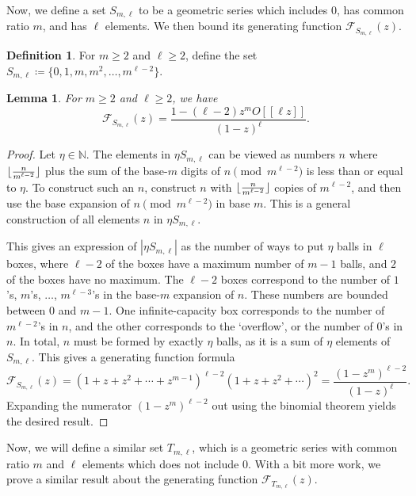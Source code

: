\documentclass{daj}
\newtheorem{lemma}[theorem]{Lemma}
\theoremstyle{definition}
\newtheorem{definition}[theorem]{Definition}
\theoremstyle{remark}
\numberwithin{equation}{section}
\numberwithin{theorem}{section}
\newcommand{\N}{\mathbb{N}}
\newcommand{\calf}{\mathcal{F}}
\DeclarePairedDelimiter{\floor}{\lfloor}{\rfloor}
\begin{document}
Now, we define a set $S_{m,\ell}$ to be a geometric series which includes 0, has common ratio $m$, and has $\ell$ elements. We then bound its generating function $\calf_{S_{m,\ell}}(z)$.

\begin{definition}
    For $m\geq 2$ and $\ell \geq 2$, define the set $S_{m,\ell}\coloneq  \{0,1,m,m^2,\ldots,m^{\ell-2}\}$.
\end{definition}

\begin{lemma}\label{lemmaHSML}
    For $m\geq 2$ and $\ell \geq 2$, we have 
    \[\calf_{S_{m,\ell}}(z) = \frac{1-(\ell-2)z^mO[[\ell z]]}{(1-z)^\ell}.\]
\end{lemma}

\begin{proof}
    Let $\eta \in \N$. The elements in $\eta S_{m,\ell}$ can be viewed as numbers $n$ where $\floor{\frac{n}{m^{\ell-2}}}$ plus the sum of the base-$m$ digits of $n \pmod{m^{\ell-2}}$ is less than or equal to $\eta$. To construct such an $n$, construct $n$ with $\floor{\frac{n}{m^{\ell-2}}}$ copies of $m^{\ell-2}$, and then use the base expansion of $n \pmod{m^{\ell-2}}$ in base $m$. This is a general construction of all elements $n$ in $\eta S_{m,\ell}$. 

    This gives an expression of $|\eta S_{m,\ell}|$ as the number of ways to put $\eta$ balls in $\ell$ boxes, where $\ell-2$ of the boxes have a maximum number of $m-1$ balls, and $2$ of the boxes have no maximum. The $\ell-2$ boxes correspond to the number of $1$'s, $m$'s, $\ldots$, $m^{\ell-3}$'s in the base-$m$ expansion of $n$. These numbers are bounded between $0$ and $m-1$. One infinite-capacity box corresponds to the number of $m^{\ell-2}$'s in $n$, and the other corresponds to the `overflow', or the number of $0$'s in $n$. In total, $n$ must be formed by exactly $\eta $ balls, as it is a sum of $\eta $ elements of $S_{m,\ell}$. This gives a generating function formula 
    \[\calf_{S_{m,\ell}}(z) = (1+z+z^2+\cdots+z^{m-1})^{\ell-2}(1+z+z^2+\cdots)^2 = \frac{(1-z^m)^{\ell-2}}{(1-z)^\ell}.\]
    Expanding the numerator $(1-z^m)^{\ell-2}$ out using the binomial theorem yields the desired result.
\end{proof}

Now, we will define a similar set $T_{m,\ell}$, which is a geometric series with common ratio $m$ and $\ell$ elements which does not include 0. With a bit more work, we prove a similar result about the generating function $\calf_{T_{m,\ell}}(z)$. 
\end{document}
